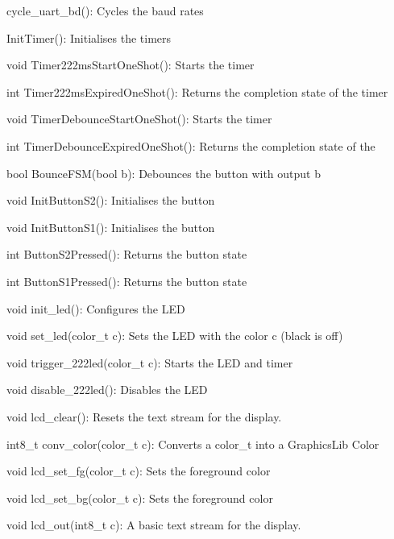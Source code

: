 \documentclass[12pt,letterpaper,notitlepage]{article}
\begin{document}
\begin{raggedright}
cycle\_uart\_bd(): Cycles the baud rates

InitTimer(): Initialises the timers

void Timer222msStartOneShot(): Starts the timer

int Timer222msExpiredOneShot(): Returns the completion state of the timer

void TimerDebounceStartOneShot(): Starts the timer

int TimerDebounceExpiredOneShot(): Returns the completion state of the 

bool BounceFSM(bool b): Debounces the button with output b

void InitButtonS2(): Initialises the button

void InitButtonS1(): Initialises the button

int ButtonS2Pressed(): Returns the button state

int ButtonS1Pressed(): Returns the button state

void init\_led(): Configures the LED

void set\_led(color\_t c): Sets the LED with the color c (black is off)

void trigger\_222led(color\_t c): Starts the LED and timer

void disable\_222led(): Disables the LED

void lcd\_clear(): Resets the text stream for the display.

int8\_t conv\_color(color\_t c): Converts a color\_t into a GraphicsLib Color

void lcd\_set\_fg(color\_t c): Sets the foreground color

void lcd\_set\_bg(color\_t c): Sets the foreground color

void lcd\_out(int8\_t c): A basic text stream for the display.

\end{raggedright}
\end{document}
